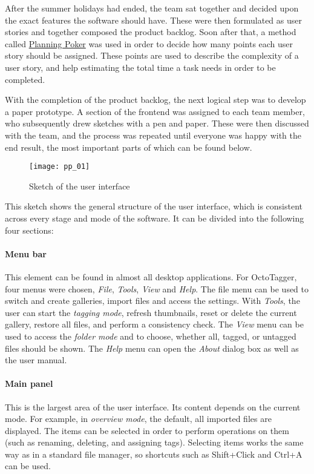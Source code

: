 After the summer holidays had ended, the team sat together and decided upon the
exact features the software should have. These were then formulated as user
stories and together composed the product backlog. Soon after that, a method
called \href{https://en.wikipedia.org/wiki/Planning_poker}{Planning Poker} was
used in order to decide how many points each user story should be assigned.
These points are used to describe the complexity of a user story, and help
estimating the total time a task needs in order to be completed.

With the completion of the product backlog, the next logical step was to
develop a paper prototype. A section of the frontend was assigned to each team
member, who subsequently drew sketches with a pen and paper. These were then
discussed with the team, and the process was repeated until everyone was happy
with the end result, the most important parts of which can be found below.

\begin{figure}
	\centering
	\texttt{[image: pp\_01]}
	\caption{Sketch of the user interface}
\end{figure}

This sketch shows the general structure of the user interface, which is
consistent across every stage and mode of the software. It can be divided into
the following four sections:

\paragraph{Menu bar} This element can be found in almost all desktop
applications. For OctoTagger, four menus were chosen, \emph{File},
\emph{Tools}, \emph{View} and \emph{Help}. The file menu can be used to switch
and create galleries, import files and access the settings. With \emph{Tools}, the
user can start the \emph{tagging mode}, refresh thumbnails, reset or delete the
current gallery, restore all files, and perform a consistency check.  The \emph{View}
menu can be used to access the \emph{folder mode} and to choose, whether all,
tagged, or untagged files should be shown. The \emph{Help} menu can open the \emph{About}
dialog box as well as the user manual.

\paragraph{Main panel} This is the largest area of the user interface. Its content
depends on the current mode. For example, in \emph{overview mode}, the default,
all imported files are displayed. The items can be selected in order to perform
operations on them (such as renaming, deleting, and assigning tags). Selecting
items works the same way as in a standard file manager, so shortcuts
such as Shift+Click and Ctrl+A can be used. %

